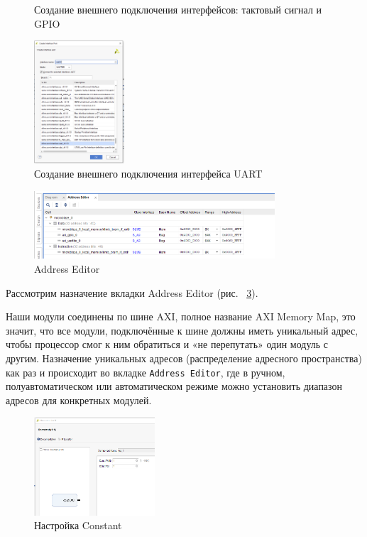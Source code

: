 \documentclass[a4paper,oneside ,14pt]{extreport}
\begin{document}
\begin{figure}[htbp]
{\begin{minipage}{8cm}
			\label{m_35}
		\end{minipage}
	}
	\caption{Создание внешнего подключения интерфейсов: тактовый сигнал и GPIO} %
\end{figure}

\begin{figure}[!ht]
	\centering
	\includegraphics[width=0.3\textwidth]{image/m_37.png}
	\caption{Создание внешнего подключения интерфейса UART}
	\label{m_37}
\end{figure}

\begin{figure}[!ht]
	\centering
	\includegraphics[width=0.8\textwidth]{image/m_39.png}
	\caption{Address Editor}
	\label{Address_Editor}
\end{figure}

Рассмотрим назначение вкладки Address Editor (рис. ~\ref{Address_Editor}).

Наши модули соединены по шине AXI, полное название AXI Memory Map, это 
значит, что все модули, подключённые к шине должны иметь уникальный адрес, 
чтобы процессор смог к ним обратиться и «не перепутать» один модуль с другим. 
Назначение уникальных адресов (распределение адресного пространства) как раз и 
происходит во вкладке \verb|Address Editor|, где в ручном, полуавтоматическом или
автоматическом режиме можно установить диапазон адресов для конкретных 
модулей.

\begin{figure}[!ht]
	\centering
	\includegraphics[width=0.4\textwidth]{image/log_1_1.png}
	\caption{Настройка Constant}
	\label{m_41}
\end{figure}
\end{document}
